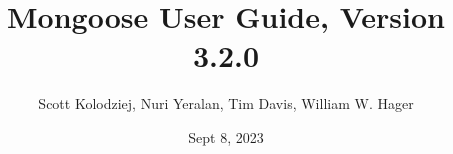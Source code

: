 \title{Mongoose User Guide, Version 3.2.0}
\author{Scott Kolodziej, Nuri Yeralan, Tim Davis, William W. Hager}
\date{Sept 8, 2023}
